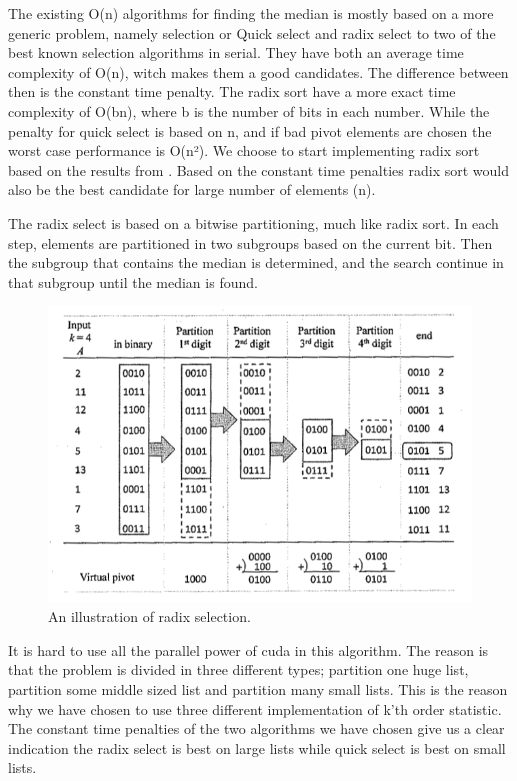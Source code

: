 \begin{enumerate}
\begin{enumerate}
The existing O(n) algorithms for finding the median is mostly based on a more generic problem, namely selection or 
Quick select and radix select to two of the best known selection algorithms in serial. They have both an average time complexity of O(n), witch makes them a good candidates. The difference between then is the constant time penalty. The radix sort have a more exact time complexity of O(bn), where b is the number of bits in each number. While the penalty for quick select is based on n, and if bad pivot elements are chosen the worst case performance is O(n²). We choose to start implementing radix sort based on the results from 
. Based on the constant time penalties radix sort would also be the best candidate for large number of elements (n).

The radix select is based on a bitwise partitioning, much like radix sort. In each step, elements are partitioned in two subgroups based on the current bit. Then the subgroup that contains the median is determined, and the search continue in that subgroup until the median is found.

\begin{figure}[ht!]
\centering
\includegraphics[width=120mm]{gfx/Radix_select.png}

\caption{An illustration of radix selection.}
\label{fig:radix_select}
\end{figure}

It is hard to use all the parallel power of cuda in this algorithm. The reason is that the problem is divided in three different types; partition one huge list, partition some middle sized list and partition many small lists. This is the reason why we have chosen to use three different implementation of k'th order statistic. The constant time penalties of the two algorithms we have chosen give us a clear indication the radix select is best on large lists while quick select is best on small lists.


\end{enumerate}
\end{enumerate}
